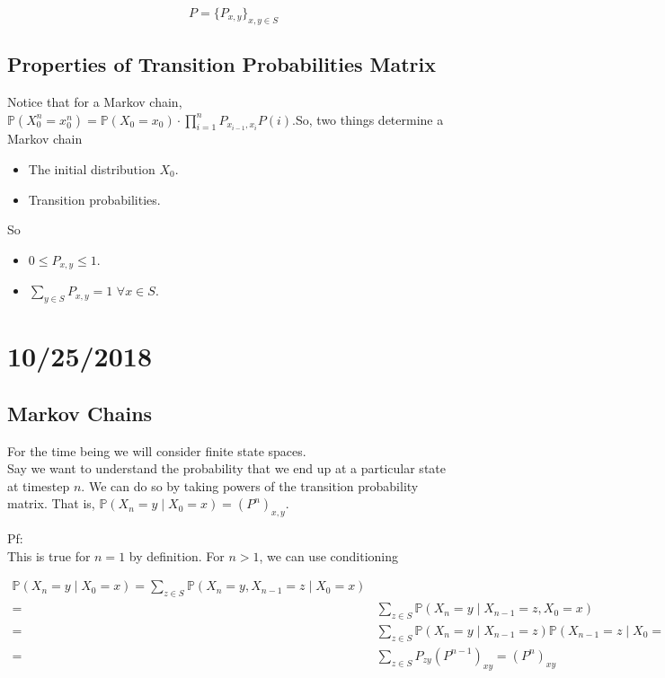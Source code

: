 \documentclass[english, 11pt]{article}
\begin{document}
\[P = \{P_{x, y}\}_{x, y \in S}\]

\subsection{Properties of Transition Probabilities Matrix}

Notice that for a Markov chain, $\mathbb{P}(X_0^n = x_0^n) = \mathbb{P}(X_0 = x_0) \cdot \prod_{i = 1}^{n} P_{x_{i-1}, x_i}P(i)$.So, two things determine a Markov chain

\begin{itemize}
	\item The initial distribution $X_0$.
	\item Transition probabilities.
\end{itemize}

So

\begin{itemize}
	\item $0 \leq P_{x, y} \leq 1$.
	\item $\sum_{y \in S} P_{x, y} = 1$ $\forall x \in S$. 
\end{itemize}

\section{10/25/2018}

\subsection{Markov Chains}
For the time being we will consider finite state spaces.\\

Say we want to understand the probability that we end up at a particular state at timestep $n$. We can do so by taking powers of the transition probability matrix. That is, $\mathbb{P}(X_n = y \mid X_0 = x) = (P^n)_{x, y}$.

Pf:\\
This is true for $n=1$ by definition. For $n > 1$, we can use conditioning

\begin{align*}
\mathbb{P}(X_n = y \mid X_0 = x) = \sum_{z \in S} \mathbb{P}(X_n = y, X_{n-1} = z \mid X_0 = x)\\
=&\sum_{z \in S} \mathbb{P}(X_n = y \mid X_{n-1} = z, X_0 = x)\\
=& \sum_{z \in S} \mathbb{P}(X_n = y \mid X_{n-1} = z) \mathbb{P}(X_{n-1} = z \mid X_0 = x)\\
=& \sum_{z \in S} P_{zy}(P^{n-1})_{xy} = (P^n)_{xy}
\end{align*}
\end{document}
